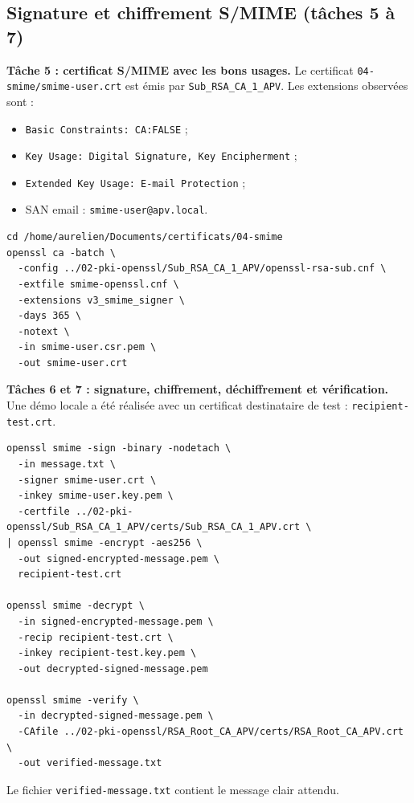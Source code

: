\documentclass[11pt,a4paper]{article}
\newcommand{\tri}{\texttt{APV}}
\newcommand{\fichier}[1]{\texttt{#1}}
\begin{document}
\subsection{Signature et chiffrement S/MIME (tâches 5 à 7)}

\textbf{Tâche 5 : certificat S/MIME avec les bons usages.}
Le certificat \fichier{04-smime/smime-user.crt} est émis par
\texttt{Sub\_RSA\_CA\_1\_\tri}. Les extensions observées sont :
\begin{itemize}[leftmargin=1.4em]
  \item \texttt{Basic Constraints: CA:FALSE} ;
  \item \texttt{Key Usage: Digital Signature, Key Encipherment} ;
  \item \texttt{Extended Key Usage: E-mail Protection} ;
  \item SAN email : \texttt{smime-user@apv.local}.
\end{itemize}
\begin{lstlisting}[style=cmd]
cd /home/aurelien/Documents/certificats/04-smime
openssl ca -batch \
  -config ../02-pki-openssl/Sub_RSA_CA_1_APV/openssl-rsa-sub.cnf \
  -extfile smime-openssl.cnf \
  -extensions v3_smime_signer \
  -days 365 \
  -notext \
  -in smime-user.csr.pem \
  -out smime-user.crt
\end{lstlisting}

\textbf{Tâches 6 et 7 : signature, chiffrement, déchiffrement et vérification.}
Une démo locale a été
réalisée avec un certificat destinataire de test : \fichier{recipient-test.crt}.
\begin{lstlisting}[style=cmd]
openssl smime -sign -binary -nodetach \
  -in message.txt \
  -signer smime-user.crt \
  -inkey smime-user.key.pem \
  -certfile ../02-pki-openssl/Sub_RSA_CA_1_APV/certs/Sub_RSA_CA_1_APV.crt \
| openssl smime -encrypt -aes256 \
  -out signed-encrypted-message.pem \
  recipient-test.crt

openssl smime -decrypt \
  -in signed-encrypted-message.pem \
  -recip recipient-test.crt \
  -inkey recipient-test.key.pem \
  -out decrypted-signed-message.pem

openssl smime -verify \
  -in decrypted-signed-message.pem \
  -CAfile ../02-pki-openssl/RSA_Root_CA_APV/certs/RSA_Root_CA_APV.crt \
  -out verified-message.txt
\end{lstlisting}
\begin{reponse}
Le fichier \fichier{verified-message.txt} contient le message clair attendu.
\end{reponse}
\end{document}
